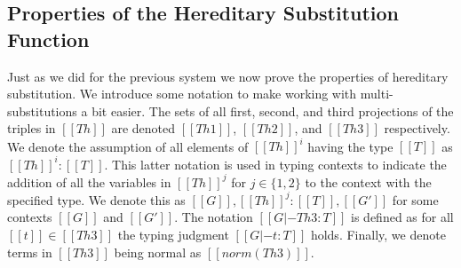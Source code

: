 \subsection{Properties of the Hereditary Substitution Function}
\label{subsec:properties_of_the_hereditary_substitution_function}
Just as we did for the previous system we now prove the properties of
hereditary substitution.  We introduce some notation to make working
with multi-substitutions a bit easier.  The sets of all first, second,
and third projections of the triples in $[[Th]]$ are denoted $[[Th
1]]$, $[[Th 2]]$, and $[[Th 3]]$ respectively.  We denote the
assumption of all elements of $[[Th]]^i$ having the type $[[T]]$ as
$[[Th]]^i : [[T]]$. This latter notation is used in typing contexts to
indicate the addition of all the variables in $[[Th]]^j$ for $j \in
\{1,2\}$ to the context with the specified type.  We denote this as
$[[G]],[[Th]]^j : [[T]],[[G']]$ for some contexts $[[G]]$ and
$[[G']]$.  The notation $[[G |- Th 3 : T]]$ is defined as for all
$[[t]] \in [[Th 3]]$ the typing judgment $[[G |- t : T]]$ holds.
Finally, we denote terms in $[[Th 3]]$ being normal as $[[norm(Th
3)]]$.

